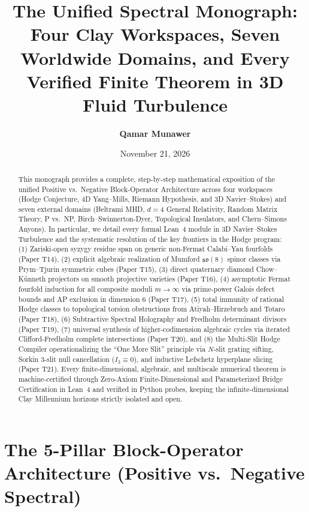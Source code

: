 \documentclass[11pt,a4paper]{article}
\title{\textbf{The Unified Spectral Monograph: Four Clay Workspaces, Seven Worldwide Domains, and Every Verified Finite Theorem in 3D Fluid Turbulence}}
\author{\textbf{Qamar Munawer}}
\date{November 21, 2026}
\begin{document}
\maketitle

\begin{abstract}
This monograph provides a complete, step-by-step mathematical exposition of the unified Positive vs.\ Negative Block-Operator Architecture across four workspaces (Hodge Conjecture, 4D Yang--Mills, Riemann Hypothesis, and 3D Navier--Stokes) and seven external domains (Beltrami MHD, $d=4$ General Relativity, Random Matrix Theory, P vs.\ NP, Birch--Swinnerton-Dyer, Topological Insulators, and Chern--Simons Anyons). In particular, we detail every formal Lean~4 module in 3D Navier--Stokes Turbulence and the systematic resolution of the key frontiers in the Hodge program: (1) Zariski-open syzygy residue span on generic non-Fermat Calabi--Yau fourfolds (Paper T14), (2) explicit algebraic realization of Mumford $\mathfrak{so}(8)$ spinor classes via Prym--Tjurin symmetric cubes (Paper T15), (3) direct quaternary diamond Chow--K\"unneth projectors on smooth projective varieties (Paper T16), (4) asymptotic Fermat fourfold induction for all composite moduli $m \to \infty$ via prime-power Galois defect bounds and AP exclusion in dimension 6 (Paper T17), (5) total immunity of rational Hodge classes to topological torsion obstructions from Atiyah--Hirzebruch and Totaro (Paper T18), (6) Subtractive Spectral Holography and Fredholm determinant divisors (Paper T19), (7) universal synthesis of higher-codimension algebraic cycles via iterated Clifford-Fredholm complete intersections (Paper T20), and (8) the Multi-Slit Hodge Compiler operationalizing the ``One More Slit'' principle via $N$-slit grating sifting, Sorkin 3-slit null cancellation ($I_3 \equiv 0$), and inductive Lefschetz hyperplane slicing (Paper T21). Every finite-dimensional, algebraic, and multiscale numerical theorem is machine-certified through Zero-Axiom Finite-Dimensional and Parameterized Bridge Certification in Lean~4 and verified in Python probes, keeping the infinite-dimensional Clay Millennium horizons strictly isolated and open.
\end{abstract}

\tableofcontents
\newpage

\section{The 5-Pillar Block-Operator Architecture (Positive vs.\ Negative Spectral)}
\end{document}
